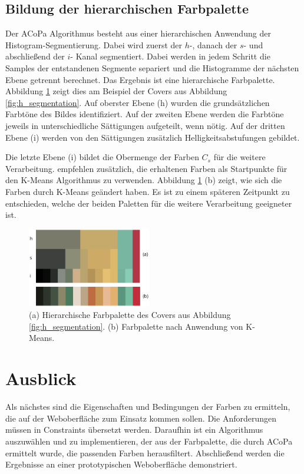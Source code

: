 \documentclass[11pt, bibliography=totoc]{scrartcl}
\begin{document}
\subsection{Bildung der hierarchischen Farbpalette}

Der ACoPa Algorithmus besteht aus einer hierarchischen Anwendung der Histogram-Segmentierung. Dabei wird zuerst der $h$-, danach der $s$- und abschließend der $i$- Kanal segmentiert. Dabei werden in jedem Schritt die Samples der entstandenen Segmente separiert und die Histogramme der nächsten Ebene getrennt berechnet. Das Ergebnis ist eine hierarchische Farbpalette. Abbildung \ref{fig:palette} zeigt dies am Beispiel der Covers aus Abbildung \ref{fig:h_segmentation}. Auf oberster Ebene (h) wurden die grundsätzlichen Farbtöne des Bildes identifiziert. Auf der zweiten Ebene werden die Farbtöne jeweils in unterschiedliche Sättigungen aufgeteilt, wenn nötig. Auf der dritten Ebene (i) werden von den Sättigungen zusätzlich Helligkeitsabstufungen gebildet.

Die letzte Ebene (i) bildet die Obermenge der Farben $C_s$ für die weitere Verarbeitung. \citet{acopa} empfehlen zusätzlich, die erhaltenen Farben als Startpunkte für den K-Means Algorithmus zu verwenden. Abbildung \ref{fig:palette} (b) zeigt, wie sich die Farben durch K-Means geändert haben. Es ist zu einem späteren Zeitpunkt zu entschieden, welche der beiden Paletten für die weitere Verarbeitung geeigneter ist.

\begin{figure}[h]
\centering
\includegraphics[width=0.48\textwidth]{img/palette.png}
\caption{(a) Hierarchische Farbpalette des Covers aus Abbildung \ref{fig:h_segmentation}. (b) Farbpalette nach Anwendung von K-Means.}
\label{fig:palette}
\end{figure}

\section{Ausblick}

Als nächstes sind die Eigenschaften und Bedingungen der Farben zu ermitteln, die auf der Weboberfläche zum Einsatz kommen sollen. Die Anforderungen müssen in Constraints übersetzt werden. Daraufhin ist ein Algorithmus auszuwählen und zu implementieren, der aus der Farbpalette, die durch ACoPa ermittelt wurde, die passenden Farben herausfiltert. Abschließend werden die Ergebnisse an einer prototypischen Weboberfläche demonstriert.


\footnotesize{}
\end{document}
